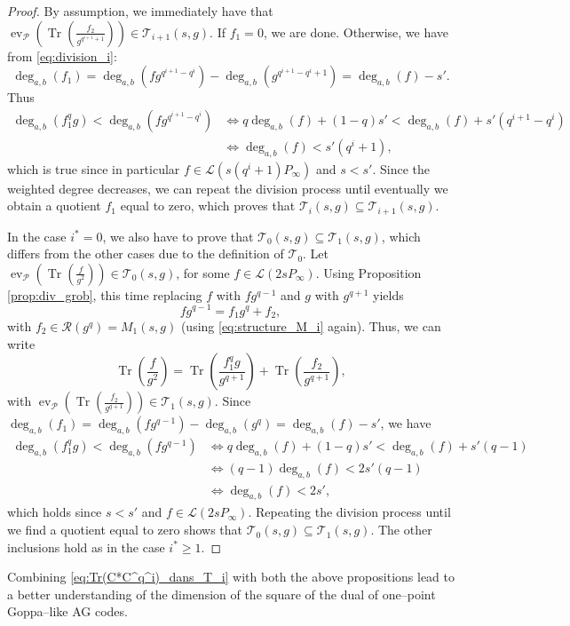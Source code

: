 \documentclass[a4paper]{amsart}
\theoremstyle{definition}
\theoremstyle{remark}
\DeclareMathOperator{\ev}{ev}
\DeclareMathOperator{\trace}{Tr}
\newcommand{\calP}{\mathcal{P}}
\newcommand{\calL}{\mathcal{L}}
\newcommand{\calR}{\mathcal{R}}
\newcommand{\calT}{\mathcal{T}}
\newcommand{\Tr}[1]{\trace\!\left(#1\right)}
\newcommand{\degab}[1]{\deg_{a,b}\left(#1\right)}
\begin{document}
\begin{proof}
By assumption, we immediately have that $\ev_{\calP}\left(\Tr{\frac{f_2}{g^{q^{i+1}+1}}}\right) \in \calT_{i+1}(s,g).$
If $f_1=0$, we are done. Otherwise, we have from \eqref{eq:division_i}:
$$\degab{f_1} = \degab{fg^{q^{i+1}-q^i}} - \degab{g^{q^{i+1}-q^i+1}} = \degab{f}-s'.$$
Thus
\begin{align*}
     \degab{f_1^qg} < \degab{fg^{q^{i+1}-q^i}} & \iff q\degab{f} +(1-q)s' < \degab{f} +s'(q^{i+1}-q^i) \\
                                               & \iff \degab{f} < s'(q^{i}+1),
\end{align*}
which is true since in particular $f \in \calL(s(q^i+1)P_\infty)$ and $s<s'$. Since the weighted degree decreases, we can repeat the division process until eventually we obtain a quotient $f_1$ equal to zero, which proves that $\calT_i(s,g) \subseteq \calT_{i+1}(s,g)$.

In the case $i^*=0$, we also have to prove that $\calT_0(s,g) \subseteq \calT_1(s,g)$, which differs from the other cases due to the definition of $\calT_0$. Let $\ev_{\calP}\left(\Tr{\frac{f}{g^2}}\right) \in \calT_0(s,g)$, for some $f \in \calL(2sP_\infty)$. Using Proposition \ref{prop:div_grob}, this time replacing $f$ with $fg^{q-1}$ and $g$ with $g^{q+1}$ yields
$$fg^{q-1} = f_1g^q + f_2,$$ with $f_2 \in \calR(g^q) = M_1(s,g)$ (using \eqref{eq:structure_M_i} again).
Thus, we can write
    $$ \Tr{\frac{f}{g^2}} = \Tr{\frac{f_1^qg}{g^{q+1}}}  + \Tr{\frac{f_2}{g^{q+1}}}, $$
with $\ev_{\calP}\left(\Tr{\frac{f_2}{g^{q+1}}}\right) \in \calT_1(s,g)$. Since $\degab{f_1} = \degab{fg^{q-1}} - \degab{g^q} = \degab{f}-s'$, we have 
\begin{align*}
     \degab{f_1^qg} < \degab{fg^{q-1}} & \iff q\degab{f} +(1-q)s' < \degab{f} + s'(q-1)\\
                                               & \iff (q-1)\degab{f} < 2s'(q-1)\\
                                               & \iff \degab{f} < 2s',
\end{align*}
which holds since $s<s'$ and $f \in \calL(2sP_\infty)$. Repeating the division process until we find a quotient equal to zero shows that $\calT_0(s,g) \subseteq \calT_1(s,g)$. The other inclusions hold as in the case $i^* \geq 1$.
\end{proof}
Combining \eqref{eq:Tr(C*C^q^i)_dans_T_i} with both the above propositions lead to a better understanding of the dimension of the square of the dual of one--point Goppa--like AG codes. 
\end{document}
